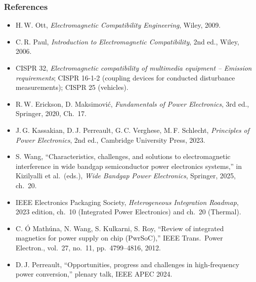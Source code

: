 \begin{frame}
	\frametitle{References}
	\scriptsize
	\begin{itemize}
		\item H.\,W. Ott, \textit{Electromagnetic Compatibility Engineering}, Wiley, 2009.
		\item C.\,R. Paul, \textit{Introduction to Electromagnetic Compatibility}, 2nd ed., Wiley, 2006.
		\item CISPR 32, \textit{Electromagnetic compatibility of multimedia equipment -- Emission requirements}; CISPR 16-1-2 (coupling devices for conducted disturbance measurements); CISPR 25 (vehicles).
		\item R.\,W. Erickson, D. Maksimovi\'c, \textit{Fundamentals of Power Electronics}, 3rd ed., Springer, 2020, Ch.\ 17.
		\item J.\,G. Kassakian, D.\,J. Perreault, G.\,C. Verghese, M.\,F. Schlecht, \textit{Principles of Power Electronics}, 2nd ed., Cambridge University Press, 2023.
		\item S. Wang, ``Characteristics, challenges, and solutions to electromagnetic interference in wide bandgap semiconductor power electronics systems,'' in Kizilyalli et al.\ (eds.), \textit{Wide Bandgap Power Electronics}, Springer, 2025, ch.\ 20.
		\item IEEE Electronics Packaging Society, \textit{Heterogeneous Integration Roadmap}, 2023 edition, ch.\ 10 (Integrated Power Electronics) and ch.\ 20 (Thermal).
		\item C. \'O Math\'una, N. Wang, S. Kulkarni, S. Roy, ``Review of integrated magnetics for power supply on chip (PwrSoC),'' IEEE Trans.\ Power Electron., vol.\ 27, no.\ 11, pp.\ 4799--4816, 2012.
		\item D.\,J. Perreault, ``Opportunities, progress and challenges in high-frequency power conversion,'' plenary talk, IEEE APEC 2024.
	\end{itemize}
\end{frame}
